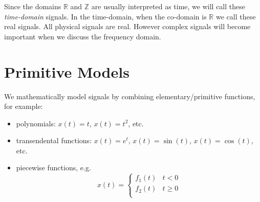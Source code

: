 Since the domains $\mathbb{R}$ and $\mathbb{Z}$ are usually interpreted as time, we will call these {\it time-domain} signals. In the time-domain, when the co-domain is $\mathbb{R}$ we call these real signals. All physical signals are real. However complex signals will become important when we discuss the frequency domain.

\section{Primitive Models}

We mathematically model signals by combining elementary/primitive functions, for example:
  
\begin{itemize}
\item polynomials: $x(t) = t$, $x(t) = t^2$, etc.
\item transendental functions: $x(t) = e^t$, $x(t) = \sin(t)$, $x(t) = \cos(t)$, etc.
\item piecewise functions, e.g.
  \[
     x(t) = \left\{  \begin{array}{cl}
       f_1(t) & t < 0\\
       f_2(t) & t \geq 0\\
     \end{array}\right.
     \]
\end{itemize}

